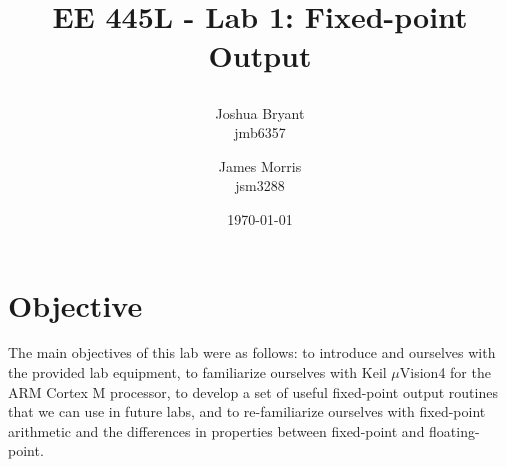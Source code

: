 \documentclass{article}
\title{\begin{LARGE}
	\textbf{EE 445L - Lab 1: Fixed-point Output}
\end{LARGE}} %
\author{Joshua Bryant \\ jmb6357 \and James Morris \\ jsm3288} %
\date{\today} %
\begin{document}
\maketitle %


\section{Objective}

The main objectives of this lab were as follows: to introduce and ourselves with the provided lab equipment, to familiarize ourselves with Keil $\mu$Vision4 for the ARM Cortex M processor, to develop a set of useful fixed-point output routines that we can use in future labs, and to re-familiarize ourselves with fixed-point arithmetic and the differences in properties between fixed-point and floating-point. 

 





\end{document}
